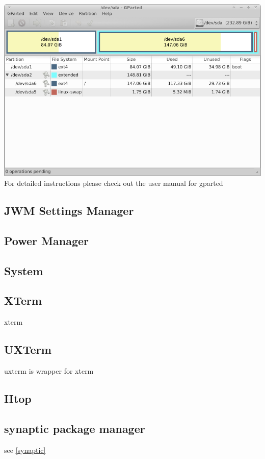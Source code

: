 \documentclass[12pt,a4paper]{book}
\begin{document}
\includegraphics[width=0.8\linewidth]{screen-shots/gparted1} \\



For detailed instructions please check out the user manual for gparted \cite{Gparted}

\newpage
\subsection{JWM Settings Manager}
\subsection{Power Manager}

\subsection{System}

\subsection{XTerm}

xterm \cite{xterm} 

\subsection{UXTerm}


uxterm \cite{uxterm} is wrapper for xterm






\subsection{Htop}
\subsection{synaptic package manager}
see \ref{synaptic}
\end{document}
